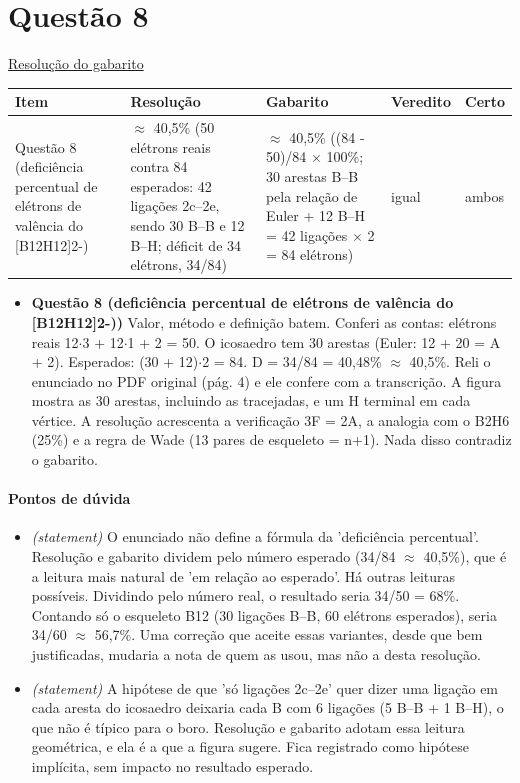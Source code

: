 \documentclass{article}%
\begin{document}
\section*{Questão 8}%
\href{https://poliedroresolve.sistemapoliedro.com.br/vestibulares/ime/2026/ime-2-fase-dia-3-25-10-2025-2-fase-dia-3/dissertativa-8-quimica-2-fase-dia-3-ime-2026}{Resolução do gabarito}\par\smallskip%
\begin{longtable}{@{}p{} p{} p{} p{} p{}@{}}\toprule Item & Resolução & Gabarito & Veredito & Certo \\ \midrule
Questão 8 (deficiência percentual de elétrons de valência do {[}B12H12{]}2-) & $\approx$ 40,5\% (50 elétrons reais contra 84 esperados: 42 ligações 2c--2e, sendo 30 B--B e 12 B--H; déficit de 34 elétrons, 34/84) & $\approx$ 40,5\% ((84 - 50)/84 $\times$ 100\%; 30 arestas B--B pela relação de Euler + 12 B--H = 42 ligações $\times$ 2 = 84 elétrons) & igual & ambos \\
\bottomrule\end{longtable}%
\begin{itemize}%
\item%
\textbf{Questão 8 (deficiência percentual de elétrons de valência do {[}B12H12{]}2-))} Valor, método e definição batem. Conferi as contas: elétrons reais 12$\cdot$3 + 12$\cdot$1 + 2 = 50. O icosaedro tem 30 arestas (Euler: 12 + 20 = A + 2). Esperados: (30 + 12)$\cdot$2 = 84. D = 34/84 = 40,48\% $\approx$ 40,5\%. Reli o enunciado no PDF original (pág. 4) e ele confere com a transcrição. A figura mostra as 30 arestas, incluindo as tracejadas, e um H terminal em cada vértice. A resolução acrescenta a verificação 3F = 2A, a analogia com o B2H6 (25\%) e a regra de Wade (13 pares de esqueleto = n+1). Nada disso contradiz o gabarito.%
\end{itemize}%
\paragraph{Pontos de dúvida}%
\begin{itemize}%
\item%
\textit{(statement)} O enunciado não define a fórmula da 'deficiência percentual'. Resolução e gabarito dividem pelo número esperado (34/84 $\approx$ 40,5\%), que é a leitura mais natural de 'em relação ao esperado'. Há outras leituras possíveis. Dividindo pelo número real, o resultado seria 34/50 = 68\%. Contando só o esqueleto B12 (30 ligações B--B, 60 elétrons esperados), seria 34/60 $\approx$ 56,7\%. Uma correção que aceite essas variantes, desde que bem justificadas, mudaria a nota de quem as usou, mas não a desta resolução.%
\item%
\textit{(statement)} A hipótese de que 'só ligações 2c--2e' quer dizer uma ligação em cada aresta do icosaedro deixaria cada B com 6 ligações (5 B--B + 1 B--H), o que não é típico para o boro. Resolução e gabarito adotam essa leitura geométrica, e ela é a que a figura sugere. Fica registrado como hipótese implícita, sem impacto no resultado esperado.%
\end{itemize}%
\end{document}
